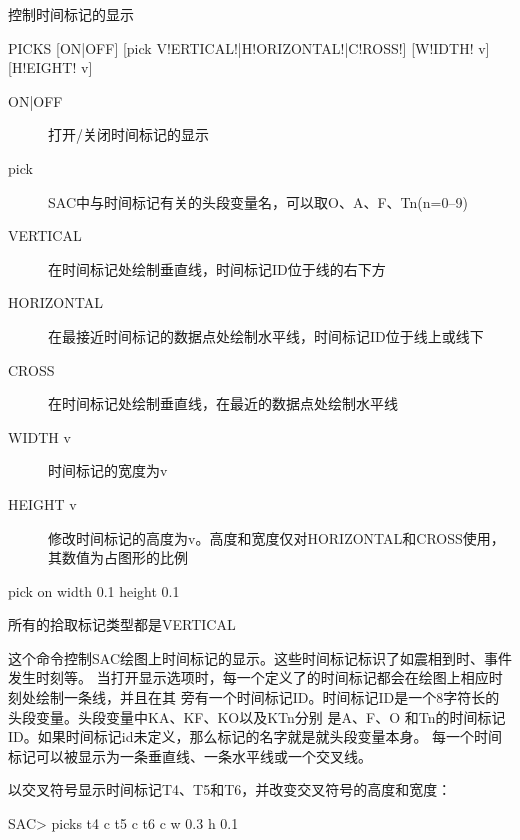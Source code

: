 \label{cmd:picks}

控制时间标记的显示

\begin{SACSTX}
PICKS [ON|OFF] [pick V!ERTICAL!|H!ORIZONTAL!|C!ROSS!] [W!IDTH! v] [H!EIGHT! v]
\end{SACSTX}

\begin{description}
\item [ON|OFF] 打开/关闭时间标记的显示
\item [pick] SAC中与时间标记有关的头段变量名，可以取O、A、F、Tn(n=0--9)
\item [VERTICAL] 在时间标记处绘制垂直线，时间标记ID位于线的右下方
\item [HORIZONTAL] 在最接近时间标记的数据点处绘制水平线，时间标记ID位于线上或线下
\item [CROSS] 在时间标记处绘制垂直线，在最近的数据点处绘制水平线
\item [WIDTH v] 时间标记的宽度为v
\item [HEIGHT v] 修改时间标记的高度为v。高度和宽度仅对HORIZONTAL和CROSS使用，其数值为占图形的比例
\end{description}

\begin{SACDFT}
pick on width 0.1 height 0.1
\end{SACDFT}
所有的拾取标记类型都是VERTICAL

这个命令控制SAC绘图上时间标记的显示。这些时间标记标识了如震相到时、事件发生时刻等。
当打开显示选项时，每一个定义了的时间标记都会在绘图上相应时刻处绘制一条线，并且在其
旁有一个时间标记ID。时间标记ID是一个8字符长的头段变量。头段变量中KA、KF、KO以及KTn分别
是A、F、O 和Tn的时间标记ID。如果时间标记id未定义，那么标记的名字就是就头段变量本身。
每一个时间标记可以被显示为一条垂直线、一条水平线或一个交叉线。

以交叉符号显示时间标记T4、T5和T6，并改变交叉符号的高度和宽度：
\begin{SACCode}
SAC> picks t4 c t5 c t6 c w 0.3 h 0.1
\end{SACCode}
